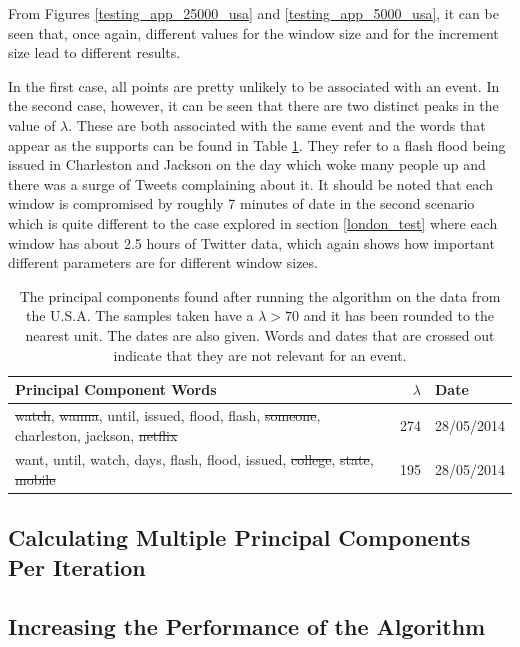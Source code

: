 \documentclass[11pt,a4paper]{article}
\begin{document}
From Figures \ref{testing_app_25000_usa} and \ref{testing_app_5000_usa}, it can be seen that, once again, different values for the window size and for the increment size lead to different results. 

In the first case, all points are pretty unlikely to be associated with an event. In the second case, however, it can be seen that there are two distinct peaks in the value of $\lambda$. These are both associated with the same event and the words that appear as the supports can be found in Table \ref{streaming_test_us}. They refer to a flash flood being issued in Charleston and Jackson on the day which woke many people up and there was a surge of Tweets complaining about it. It should be noted that each window is compromised by roughly 7 minutes of date in the second scenario which is quite different to the case explored in section \ref{london_test} where each window has about 2.5 hours of Twitter data, which again shows how important different parameters are for different window sizes. 
\begin{table}[H]
\center
\begin{tabular}{| p{11cm}| r | l|}
\hline
Principal Component Words & $\lambda$ & Date\\
\hline
\st{watch}, \st{wanna}, until, issued, flood, flash, \st{someone}, charleston, jackson, \st{netflix} & 274 & 28/05/2014	 \\
want, until, watch, days, flash, flood, issued, \st{college}, \st{state}, \st{mobile}& 195 & 28/05/2014	 \\
\hline
\end{tabular}
\caption{The principal components found after running the algorithm on the data from the U.S.A. The samples taken have a $\lambda > 70$ and it has been rounded to the nearest unit. The dates are also given. Words and dates that are crossed out indicate that they are not relevant for an event.}
\label{streaming_test_us}
\end{table}

\subsection{Calculating Multiple Principal Components Per Iteration}
\subsection{Increasing the Performance of the Algorithm}

\end{document}
